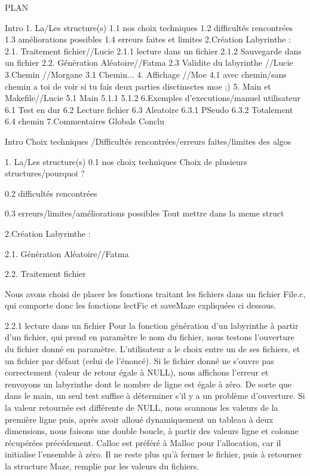 PLAN

Intro
1. La/Les  structure(s)
  1.1 nos choix techniques
  1.2 difficultés rencontrées
  1.3 améliorations possibles
  1.4 erreurs faites et limites
2.Création Labyrinthe :
  2.1. Traitement fichier//Lucie
    2.1.1 lecture dans un fichier
    2.1.2 Sauvegarde dans un fichier
  2.2. Génération Aléatoire//Fatma
  2.3 Validite du labyrinthe //Lucie
3.Chemin //Morgane
  3.1 Chemin...
4. Affichage //Moe
  4.1 avec chemin/sans chemin a toi de voir si tu fais deux parties disctinsctes moe ;)
5. Main et Makefile//Lucie
  5.1 Main
    5.1.1
    5.1.2
6.Exemples d'executions/manuel utilisateur
  6.1 Test en dur
  6.2 Lecture fichier
  6.3 Aleatoire
    6.3.1 PSeudo
    6.3.2 Totalement
  6.4 chemin
7.Commentaires Globals
Conclu






Intro
Choix techniques /Difficultés rencontrées/erreurs faites/limites des algos


1. La/Les  structure(s)
0.1 nos choix techniques
  Choix de plusieurs structures/pourquoi ?
  
0.2 difficultés rencontrées
  
0.3 erreurs/limites/améliorations possibles
Tout mettre dans la meme struct


2.Création Labyrinthe :

2.1. Génération Aléatoire//Fatma

2.2. Traitement fichier

Nous avons choisi de placer les fonctions traitant les fichiers dans un fichier File.c, qui comporte donc les fonctions lectFic et saveMaze expliquées ci dessous.

2.2.1 lecture dans un fichier
Pour la fonction génération d'un labyrinthe à partir d'un fichier, qui prend en paramètre le nom du fichier, nous testons l'ouverture du fichier donné en paramètre. L'utilisateur a le choix entre un de ses fichiers, et un fichier par défaut (celui de l'énoncé). Si le fichier donné ne s'ouvre pas correctement (valeur de retour égale à NULL), nous affichons l'erreur et renvoyons un labyrinthe dont le nombre de ligne est égale à zéro. De sorte que dans le main, un seul test suffise à déterminer s'il y a un problème d'ouverture.
Si la valeur retournée est différente de NULL, nous scannons les valeurs de la première ligne puis, après avoir alloué dynamiquement un tableau à deux dimensions, nous faisons une double boucle, à partir des valeurs ligne et colonne récupérées précédement. Calloc est préféré à Malloc pour l'allocation, car il initialise l'ensemble à zéro. Il ne reste plus qu'à fermer le fichier, puis à retourner la structure Maze, remplie par les valeurs du fichiers.

